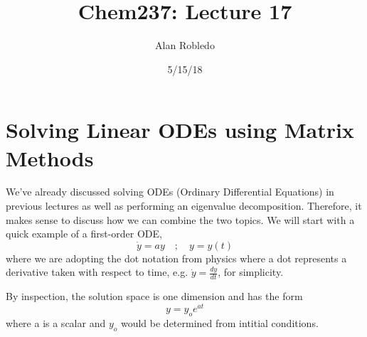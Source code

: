 \documentclass{article}
\title{Chem237: Lecture 17}
\date{5/15/18}
\author{Alan Robledo}
\newcommand{\be}{\begin{equation}}
\newcommand{\ee}{\end{equation}}
\begin{document}
\maketitle
\section*{Solving Linear ODEs using Matrix Methods}
We've already discussed solving ODEs (Ordinary Differential Equations) in previous lectures as well as performing an eigenvalue decomposition.
Therefore, it makes sense to discuss how we can combine the two topics.
We will start with a quick example of a first-order ODE,
\be
  \dot{y} = a y \quad ; \quad y = y(t)
\ee
where we are adopting the dot notation from physics where a dot represents a derivative taken with respect to time, e.g. $\dot{y} = \frac{dy}{dt}$, for simplicity.

By inspection, the solution space is one dimension and has the form
\be
  y = y_o e^{a t}
\ee
where a is a scalar and $y_o$ would be determined from intitial conditions.
\end{document}
